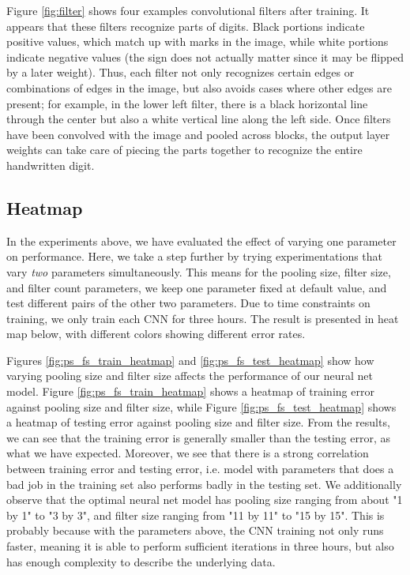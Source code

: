 \documentclass[10pt,twocolumn]{article}
\begin{document}
Figure \ref{fig:filter} shows four examples convolutional filters after training. It appears that these filters recognize parts of digits. Black portions indicate positive values, which match up with marks in the image, while white portions indicate negative values (the sign does not actually matter since it may be flipped by a later weight). Thus, each filter not only recognizes certain edges or combinations of edges in the image, but also avoids cases where other edges are present; for example, in the lower left filter, there is a black horizontal line through the center but also a white vertical line along the left side. Once filters have been convolved with the image and pooled across blocks, the output layer weights can take care of piecing the parts together to recognize the entire handwritten digit.

\subsection{Heatmap}

In the experiments above, we have evaluated the effect of varying one parameter on performance. Here, we take a step further by trying experimentations that vary \emph{two} parameters simultaneously. This means for the pooling size, filter size, and filter count parameters, we keep one parameter fixed at default value, and test different pairs of the other two parameters. Due to time constraints on training, we only train each CNN for three hours. The result is presented in heat map below, with different colors showing different error rates.

Figures \ref{fig:ps_fs_train_heatmap} and \ref{fig:ps_fs_test_heatmap} show how varying pooling size and filter size affects the performance of our neural net model. Figure \ref{fig:ps_fs_train_heatmap} shows a heatmap of training error against pooling size and filter size, while Figure \ref{fig:ps_fs_test_heatmap} shows a heatmap of testing error against pooling size and filter size. From the results, we can see that the training error is generally smaller than the testing error, as what we have expected. Moreover, we see that there is a strong correlation between training error and testing error, i.e. model with parameters that does a bad job in the training set also performs badly in the testing set. We additionally observe that the optimal neural net model has pooling size ranging from about "1 by 1" to "3 by 3", and filter size ranging from "11 by 11" to "15 by 15". This is probably because with the parameters above, the CNN training not only runs faster, meaning it is able to perform sufficient iterations in three hours, but also has enough complexity to describe the underlying data.
\end{document}
